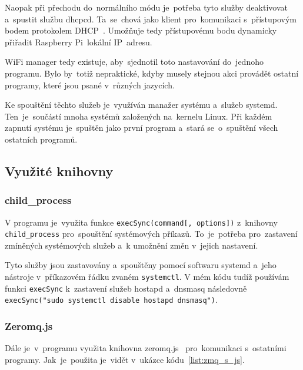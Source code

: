 Naopak při přechodu do~normálního  módu je~potřeba tyto služby deaktivovat a~spustit službu dhcpcd. Ta~se~chová jako klient pro~komunikaci s~přístupovým bodem protokolem DHCP~\cite{dhcpcd}. Umožňuje tedy přístupovému bodu dynamicky přiřadit Raspberry Pi~lokální IP~adresu.

WiFi manager tedy existuje, aby~sjednotil toto nastavování do~jednoho programu. Bylo by~totiž nepraktické, kdyby musely stejnou akci provádět ostatní programy, které jsou psané v~různých jazycích.

Ke spouštění těchto služeb je~využíván manažer systému a~služeb systemd. Ten~je~součástí mnoha systémů založených na~kernelu Linux. Při každém zapnutí systému je~spuštěn jako první program a~stará se~o~spuštění všech ostatních programů.~\cite{systemd}

\subsection{Využité knihovny}
\subsubsection{child\_process}
V programu je~využita funkce \texttt{execSync(command[, options])} z~knihovny \texttt{child_process} pro~spouštění systémových příkazů. To~je~potřeba pro~zastavení zmíněných systémových služeb a~k umožnění změn v~jejich nastavení.

Tyto služby jsou zastavovány a~spouštěny pomocí softwaru systemd a~jeho nástroje v~příkazovém řádku zvaném \texttt{systemctl}.
V mém kódu tudíž používám funkci \texttt{execSync} k~zastavení služeb hostapd a~dnsmasq následovně \texttt{execSync("sudo systemctl disable hostapd dnsmasq")}.

\subsubsection{Zeromq.js}
Dále je~v~programu využita knihovna zeromq.js~\cite{zeromqjs} pro~komunikaci s~ostatními programy. Jak~je~použita je~vidět v~ukázce kódu~\ref{list:zmq_s_js}.

\begin{code}
  \inputminted[frame=lines,fontsize=\footnotesize{}, linenos, breaklines]{js}{code_examples/zmq_server.js}
\end{code}


